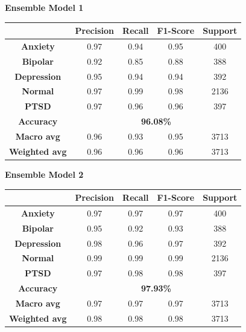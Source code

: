 \begin{center}
    \textbf{Ensemble Model 1} \\[0.2em]
    \begin{tabular}{|c|c|c|c|c|}
        \hline
        & \textbf{Precision} & \textbf{Recall} & \textbf{F1-Score} & \textbf{Support} \\ \hline
        \textbf{Anxiety}    & 0.97 & 0.94 & 0.95 & 400  \\ \hline
        \textbf{Bipolar}    & 0.92 & 0.85 & 0.88 & 388  \\ \hline
        \textbf{Depression} & 0.95 & 0.94 & 0.94 & 392  \\ \hline
        \textbf{Normal}     & 0.97 & 0.99 & 0.98 & 2136 \\ \hline
        \textbf{PTSD}       & 0.97 & 0.96 & 0.96 & 397  \\ \hline
        \textbf{Accuracy}   & \multicolumn{4}{|c|}{\textbf{96.08\%}} \\ \hline
        \textbf{Macro avg}  & 0.96 & 0.93 & 0.95 & 3713 \\ \hline
        \textbf{Weighted avg} & 0.96 & 0.96 & 0.96 & 3713 \\ \hline
    \end{tabular}
\end{center}


\begin{center}
    \textbf{Ensemble Model 2} \\[0.2em]
    \begin{tabular}{|c|c|c|c|c|}
        \hline
        & \textbf{Precision} & \textbf{Recall} & \textbf{F1-Score} & \textbf{Support} \\ \hline
        \textbf{Anxiety}    & 0.97 & 0.97 & 0.97 & 400  \\ \hline
        \textbf{Bipolar}    & 0.95 & 0.92 & 0.93 & 388  \\ \hline
        \textbf{Depression} & 0.98 & 0.96 & 0.97 & 392  \\ \hline
        \textbf{Normal}     & 0.99 & 0.99 & 0.99 & 2136 \\ \hline
        \textbf{PTSD}       & 0.97 & 0.98 & 0.98 & 397  \\ \hline
        \textbf{Accuracy}   & \multicolumn{4}{|c|}{\textbf{97.93\%}} \\ \hline
        \textbf{Macro avg}  & 0.97 & 0.97 & 0.97 & 3713 \\ \hline
        \textbf{Weighted avg} & 0.98 & 0.98 & 0.98 & 3713 \\ \hline
    \end{tabular}
\end{center}



